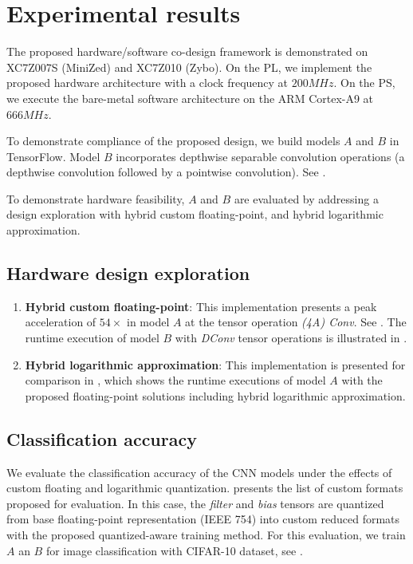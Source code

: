 \section{Experimental results}
\label{sec:experimental_results}
The proposed hardware/software co-design framework is demonstrated on XC7Z007S (MiniZed) and XC7Z010 (Zybo). On the PL, we implement the proposed hardware architecture with a clock frequency at $200 MHz$. On the PS, we execute the bare-metal software architecture on the ARM Cortex-A9 at $666MHz$.

To demonstrate compliance of the proposed design, we build models $A$ and $B$ in TensorFlow. Model $B$ incorporates depthwise separable convolution operations (a depthwise convolution followed by a pointwise convolution). See .

To demonstrate hardware feasibility, $A$ and $B$ are evaluated by addressing a design exploration with hybrid custom floating-point, and hybrid logarithmic approximation.

\subsection{Hardware design exploration}
\begin{enumerate}
\item{\textbf{Hybrid custom floating-point}}: This implementation presents a peak acceleration of $54\times$ in model $A$ at the tensor operation \emph{(4A) Conv}. See . The runtime execution of model $B$ with \emph{DConv} tensor operations is illustrated in .

\item{\textbf{Hybrid logarithmic approximation}}: This implementation is presented for comparison in , which shows the runtime executions of model $A$ with the proposed floating-point solutions including hybrid logarithmic approximation.
\end{enumerate}

\subsection{Classification accuracy}

We evaluate the classification accuracy of the CNN models under the effects of custom floating and logarithmic quantization.  presents the list of custom formats proposed for evaluation. In this case, the \emph{filter} and \emph{bias} tensors are quantized from base floating-point representation (IEEE 754) into custom reduced formats with the proposed quantized-aware training method. For this evaluation, we train $A$ an $B$ for image classification with CIFAR-10 dataset, see .



